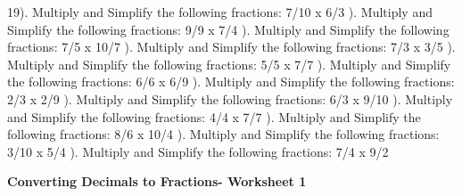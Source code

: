 \documentclass{article}%
\begin{document}
19). Multiply and Simplify the following fractions: 7/10 x 6/3%
\newline%
\newline%
). Multiply and Simplify the following fractions: 9/9 x 7/4%
\newline%
\newline%
). Multiply and Simplify the following fractions: 7/5 x 10/7%
\newline%
\newline%
). Multiply and Simplify the following fractions: 7/3 x 3/5%
\newline%
\newline%
). Multiply and Simplify the following fractions: 5/5 x 7/7%
\newline%
\newline%
). Multiply and Simplify the following fractions: 6/6 x 6/9%
\newline%
\newline%
). Multiply and Simplify the following fractions: 2/3 x 2/9%
\newline%
\newline%
). Multiply and Simplify the following fractions: 6/3 x 9/10%
\newline%
\newline%
). Multiply and Simplify the following fractions: 4/4 x 7/7%
\newline%
\newline%
). Multiply and Simplify the following fractions: 8/6 x 10/4%
\newline%
\newline%
). Multiply and Simplify the following fractions: 3/10 x 5/4%
\newline%
\newline%
). Multiply and Simplify the following fractions: 7/4 x 9/2%
\newline%
\newline%
\newline%
\pagebreak%
\large%
\begin{center}%
\textbf{Converting Decimals to Fractions- Worksheet 1}%
\newline%
\end{center} \normalsize%
\end{document}

